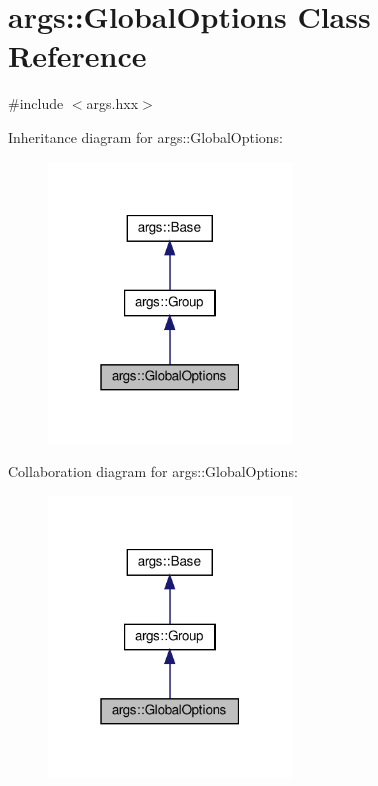 \hypertarget{classargs_1_1_global_options}{}\section{args\+:\+:Global\+Options Class Reference}
\label{classargs_1_1_global_options}


{\ttfamily \#include $<$args.\+hxx$>$}



Inheritance diagram for args\+:\+:Global\+Options\+:\nopagebreak
\begin{figure}[H]
\begin{center}
\leavevmode
\includegraphics[width=183pt]{classargs_1_1_global_options__inherit__graph}
\end{center}
\end{figure}


Collaboration diagram for args\+:\+:Global\+Options\+:\nopagebreak
\begin{figure}[H]
\begin{center}
\leavevmode
\includegraphics[width=183pt]{classargs_1_1_global_options__coll__graph}
\end{center}
\end{figure}
